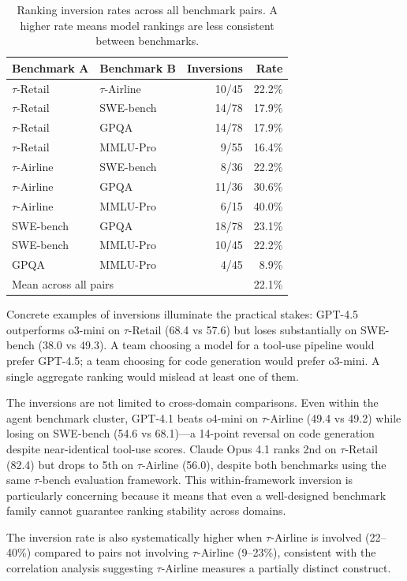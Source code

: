 \documentclass[11pt]{article}
\begin{document}
\begin{table}[t]
\caption{Ranking inversion rates across all benchmark pairs. A higher rate means model rankings are less consistent between benchmarks.}
\label{tab:inversions}
\begin{tabular}{llrr}
\toprule
Benchmark A & Benchmark B & Inversions & Rate \\
\midrule
$\tau$-Retail & $\tau$-Airline & 10/45 & 22.2\% \\
$\tau$-Retail & SWE-bench & 14/78 & 17.9\% \\
$\tau$-Retail & GPQA & 14/78 & 17.9\% \\
$\tau$-Retail & MMLU-Pro & 9/55 & 16.4\% \\
$\tau$-Airline & SWE-bench & 8/36 & 22.2\% \\
$\tau$-Airline & GPQA & 11/36 & 30.6\% \\
$\tau$-Airline & MMLU-Pro & 6/15 & 40.0\% \\
SWE-bench & GPQA & 18/78 & 23.1\% \\
SWE-bench & MMLU-Pro & 10/45 & 22.2\% \\
GPQA & MMLU-Pro & 4/45 & 8.9\% \\
\midrule
\multicolumn{2}{l}{Mean across all pairs} & & 22.1\% \\
\bottomrule
\end{tabular}
\end{table}

Concrete examples of inversions illuminate the practical stakes: GPT-4.5 outperforms o3-mini on $\tau$-Retail (68.4 vs 57.6) but loses substantially on SWE-bench (38.0 vs 49.3). A team choosing a model for a tool-use pipeline would prefer GPT-4.5; a team choosing for code generation would prefer o3-mini. A single aggregate ranking would mislead at least one of them.

The inversions are not limited to cross-domain comparisons. Even within the agent benchmark cluster, GPT-4.1 beats o4-mini on $\tau$-Airline (49.4 vs 49.2) while losing on SWE-bench (54.6 vs 68.1)---a 14-point reversal on code generation despite near-identical tool-use scores. Claude Opus 4.1 ranks 2nd on $\tau$-Retail (82.4) but drops to 5th on $\tau$-Airline (56.0), despite both benchmarks using the same $\tau$-bench evaluation framework. This within-framework inversion is particularly concerning because it means that even a well-designed benchmark family cannot guarantee ranking stability across domains.

The inversion rate is also systematically higher when $\tau$-Airline is involved (22--40\%) compared to pairs not involving $\tau$-Airline (9--23\%), consistent with the correlation analysis suggesting $\tau$-Airline measures a partially distinct construct.
\end{document}
